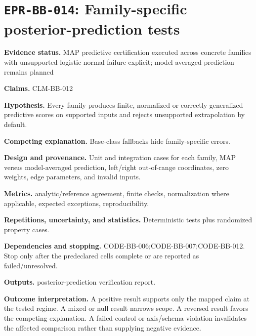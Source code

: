 \section[\texttt{EPR-BB-014}]{\texttt{EPR-BB-014}: Family-specific posterior-prediction tests}
\textbf{Evidence status.} MAP predictive certification executed across concrete families with unsupported logistic-normal failure explicit; model-averaged prediction remains planned\par
\textbf{Claims.} CLM-BB-012\par
\textbf{Hypothesis.} Every family produces finite, normalized or correctly generalized predictive scores on supported inputs and rejects unsupported extrapolation by default.\par
\textbf{Competing explanation.} Base-class fallbacks hide family-specific errors.\par
\textbf{Design and provenance.} Unit and integration cases for each family, MAP versus model-averaged prediction, left/right out-of-range coordinates, zero weights, edge parameters, and invalid inputs.\par
\textbf{Metrics.} analytic/reference agreement, finite checks, normalization where applicable, expected exceptions, reproducibility.\par
\textbf{Repetitions, uncertainty, and statistics.} Deterministic tests plus randomized property cases.\par
\textbf{Dependencies and stopping.} CODE-BB-006;CODE-BB-007;CODE-BB-012. Stop only after the predeclared cells complete or are reported as failed/unresolved.\par
\textbf{Outputs.} posterior-prediction verification report.\par
\textbf{Outcome interpretation.} A positive result supports only the mapped claim at the tested regime. A mixed or null result narrows scope. A reversed result favors the competing explanation. A failed control or axis/schema violation invalidates the affected comparison rather than supplying negative evidence.

